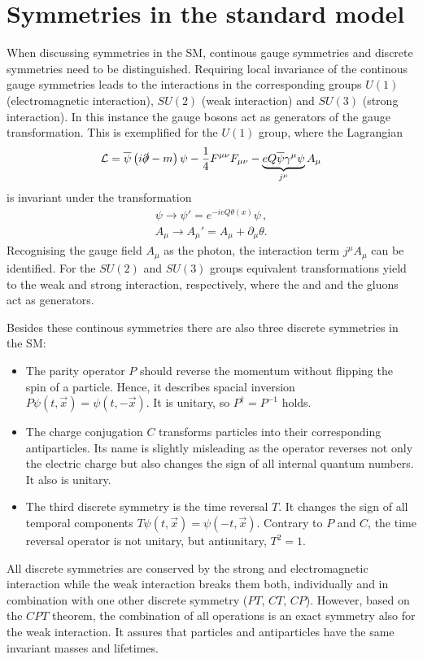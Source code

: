 \section{Symmetries in the standard model}
\label{sec:symmetriesInSM}

When discussing symmetries in the \ac{SM}, continous gauge symmetries and discrete symmetries need to be distinguished.
Requiring local invariance of the continous gauge symmetries leads to the interactions in the corresponding groups $U(1)$ (electromagnetic interaction), $SU(2)$ (weak interaction) and $SU(3)$ (strong interaction).
In this instance the gauge bosons act as generators of the gauge transformation.
This is exemplified for the $U(1)$ group, where the Lagrangian
\begin{equation}
\mathcal{L}=\overline{\psi}\left(i\slashed{\partial} - m\right)\psi
- \frac{1}{4}F^{\mu\nu}F_{\mu\nu} - \underbrace{eQ\overline{\psi}\gamma^{\mu}\psi}_{j^{\mu}}A_{\mu}
\end{equation}
is invariant under the transformation
\begin{align}
\psi\rightarrow\psi'=e^{-ieQ\theta\left(x\right)}\psi\,,\\
A_\mu\rightarrow A_\mu'=A_\mu+\partial_\mu\theta.
\end{align}
Recognising the gauge field $A_\mu$ as the photon, the interaction term $j^\mu A_\mu$ can be identified.
For the $SU(2)$ and $SU(3)$ groups equivalent transformations yield to the weak and strong interaction, respectively, where the \Wpm and \Z and the gluons act as generators.

Besides these continous symmetries there are also three discrete symmetries in the \ac{SM}:
\begin{itemize}
	\item The parity operator $P$ should reverse the momentum without flipping the spin of a particle.
		Hence, it describes spacial inversion $P\psi\left(t,\vec{x}\right) = \psi\left(t,-\vec{x}\right)$.
		It is unitary, so $P^{\dagger}=P^{-1}$ holds.
	\item The charge conjugation $C$ transforms particles into their corresponding antiparticles.
		Its name is slightly misleading as the operator reverses not only the electric charge but also changes the sign of all internal quantum numbers.
		It also is unitary.
	\item The third discrete symmetry is the time reversal $T$.
		It changes the sign of all temporal components $T\psi\left(t,\vec{x}\right) = \psi\left(-t,\vec{x}\right)$.
		Contrary to $P$ and $C$, the time reversal operator is not unitary, but antiunitary, \ie $T^2=1$.
\end{itemize}
All discrete symmetries are conserved by the strong and electromagnetic interaction while the weak interaction breaks them both,
individually and in combination with one other discrete symmetry ($PT$, $CT$, $CP$).
However, based on the $CPT$ theorem, the combination of all operations is an exact symmetry also for the weak interaction.
It assures that particles and antiparticles have the same invariant masses and lifetimes.

